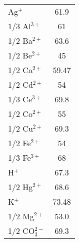 \begin{table}[h!]
\begin{tabular}{l|c}
Ag$^+$ \dotfill & 61.9 \\
1/3 Al$^{3+}$ \dotfill& 61 \\
1/2 Ba$^{2+}$\dotfill& 63.6 \\
1/2 Be$^{2+}$\dotfill& 45 \\
1/2 Ca$^{2+}$\dotfill& 59.47 \\
1/2 Cd$^{2+}$\dotfill& 54 \\
1/3 Ce$^{3+}$\dotfill& 69.8 \\
1/2 Co$^{2+}$\dotfill& 55 \\
1/2 Cu$^{2+}$\dotfill& 69.3 \\
1/2 Fe$^{2+}$\dotfill& 54 \\
1/3 Fe$^{3+}$\dotfill& 68 \\
H$^+$\dotfill& 67.3 \\
1/2 Hg$^{2+}$\dotfill& 68.6 \\
K$^+$\dotfill& 73.48 \\
1/2 Mg$^{2+}$\dotfill& 53.0 \\
1/2 CO$_3^{2-}$\dotfill & 69.3 \\

\end{tabular}
\end{table}
